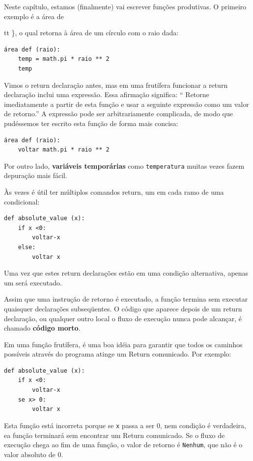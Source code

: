 \documentclass[10pt]{book}
\begin{document}
{{Neste capítulo, estamos (finalmente) vai escrever funções produtivas.
O primeiro exemplo é a área de {tt \}, o qual retorna à área de um círculo
com o raio dada:

\begin{verbatim}
área def (raio):
    temp = math.pi * raio ** 2
    temp
\end{verbatim}
%
Vimos o {return \tt} declaração antes, mas em uma frutífera
funcionar a {return \tt} declaração inclui
uma expressão. Essa afirmação significa: `` Retorne imediatamente a partir de
esta função e usar a seguinte expressão como um valor de retorno.''
A expressão pode ser arbitrariamente complicada, de modo que pudéssemos
ter escrito esta função de forma mais concisa:

\begin{verbatim}
área def (raio):
    voltar math.pi * raio ** 2
\end{verbatim}
%
Por outro lado, {\bf variáveis ​​temporárias} como {\tt temperatura} muitas vezes fazem
depuração mais fácil.

Às vezes é útil ter múltiplos comandos return, um em cada
ramo de uma condicional:

\begin{verbatim}
def absolute_value (x):
    if x <0:
        voltar-x
    else:
        voltar x
\end{verbatim}
%
Uma vez que estes {return \tt} declarações estão em uma condição alternativa,
apenas um será executado.

Assim que uma instrução de retorno é executado, a função
termina sem executar quaisquer declarações subseqüentes.
O código que aparece depois de um {return \tt} declaração, ou qualquer outro local
o fluxo de execução nunca pode alcançar, é chamado {\bf código morto}.

Em uma função frutífera, é uma boa idéia para garantir
que todos os caminhos possíveis através do programa atinge um
{Return \tt} comunicado. Por exemplo:

\begin{verbatim}
def absolute_value (x):
    if x <0:
        voltar-x
    se x> 0:
        voltar x
\end{verbatim}
%
Esta função está incorreta porque se {\tt x} passa a ser 0,
nem condição é verdadeira, ea função terminará sem encontrar um
{Return \tt} comunicado. Se o fluxo de execução chega ao fim
de uma função, o valor de retorno é {\tt Nenhum}, que não é
o valor absoluto de 0.

}}}
\end{document}
